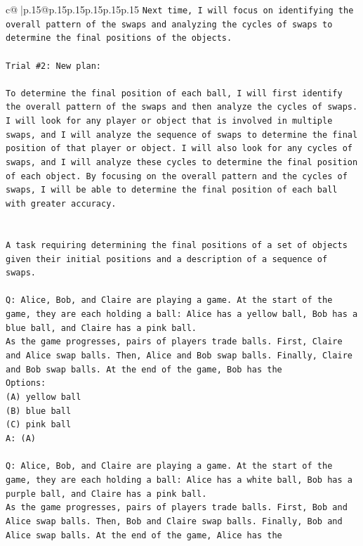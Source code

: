 \documentclass{article}
\begin{document}
{\begin{supertabular}{c@{$\;$}|p{.15\linewidth}@{}p{.15\linewidth}p{.15\linewidth}p{.15\linewidth}p{.15\linewidth}p{.15\linewidth}}
{{{\texttt{Next time, I will focus on identifying the overall pattern of the swaps and analyzing the cycles of swaps to determine the final positions of the objects.} \\
\\ 
\texttt{Trial \#2: New plan: } \\
\\ 
\texttt{To determine the final position of each ball, I will first identify the overall pattern of the swaps and then analyze the cycles of swaps. I will look for any player or object that is involved in multiple swaps, and I will analyze the sequence of swaps to determine the final position of that player or object. I will also look for any cycles of swaps, and I will analyze these cycles to determine the final position of each object. By focusing on the overall pattern and the cycles of swaps, I will be able to determine the final position of each ball with greater accuracy.} \\
\\ 
\\ 
\texttt{A task requiring determining the final positions of a set of objects given their initial positions and a description of a sequence of swaps.} \\
\\ 
\texttt{Q: Alice, Bob, and Claire are playing a game. At the start of the game, they are each holding a ball: Alice has a yellow ball, Bob has a blue ball, and Claire has a pink ball.} \\
\texttt{As the game progresses, pairs of players trade balls. First, Claire and Alice swap balls. Then, Alice and Bob swap balls. Finally, Claire and Bob swap balls. At the end of the game, Bob has the} \\
\texttt{Options:} \\
\texttt{(A) yellow ball} \\
\texttt{(B) blue ball} \\
\texttt{(C) pink ball} \\
\texttt{A: (A)} \\
\\ 
\texttt{Q: Alice, Bob, and Claire are playing a game. At the start of the game, they are each holding a ball: Alice has a white ball, Bob has a purple ball, and Claire has a pink ball.} \\
\texttt{As the game progresses, pairs of players trade balls. First, Bob and Alice swap balls. Then, Bob and Claire swap balls. Finally, Bob and Alice swap balls. At the end of the game, Alice has the} \\
}}}
\end{supertabular}}
\end{document}
